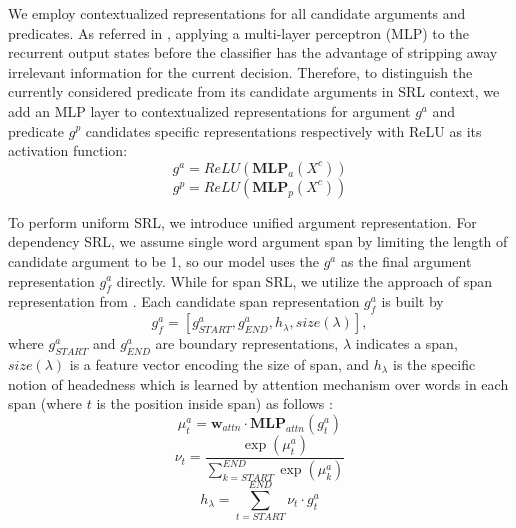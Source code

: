 \documentclass[letterpaper]{article} %
\begin{document}
We employ contextualized representations for all candidate arguments and predicates. As referred in \cite{dozat2017deep}, applying a multi-layer perceptron (MLP) to the recurrent output states before the classifier has the advantage of stripping away irrelevant information for the current decision. Therefore, to distinguish the currently considered predicate from its candidate arguments in SRL context, we add an MLP layer to contextualized representations for argument $g^a$ and predicate $g^p$ candidates specific representations respectively with ReLU \cite{nair2010rectified} as its activation function:
$$g^a = \textit{ReLU}(\textbf{MLP}_a (X^c))$$
$$g^p = \textit{ReLU}(\textbf{MLP}_p (X^c))$$

To  perform uniform SRL, we introduce unified argument representation. For dependency SRL, we assume single word argument span by limiting the length of candidate argument to be 1, so our model uses the $g^a$ as the final argument representation $g^a_f$ directly. While for span SRL, we utilize the approach of span representation from \citeauthor{lee2017end} . Each candidate span representation $g^a_f$ is built by
\begin{equation}
g^a_f = [g^a_{\textit{START}} , g^a_{\textit{END}} , h_\lambda , size(\lambda)],\nonumber
\end{equation}
where $g_{START}^a$  and $g_{END}^a$ are boundary representations, $\lambda$ indicates a span, $size(\lambda)$ is a feature vector encoding the size of span, and $h_\lambda$ is the specific notion of headedness which is learned by attention mechanism \cite{bahdanau2014neural} over words in each span (where $t$ is the position inside span) as follows :
$$\mu^a_t = \textbf{w}_{attn} \cdot \textbf{MLP}_{attn} (g^a_t)$$ 
$$\nu_t = \frac{\exp(\mu^a_t)}{\sum_{k=\textit{START}}^{\textit{END}} \exp(\mu^a_k)}$$
$$h_{\lambda} = \sum_{t=\textit{START}}^{\textit{END}} \nu_t \cdot g^a_t$$
\end{document}
